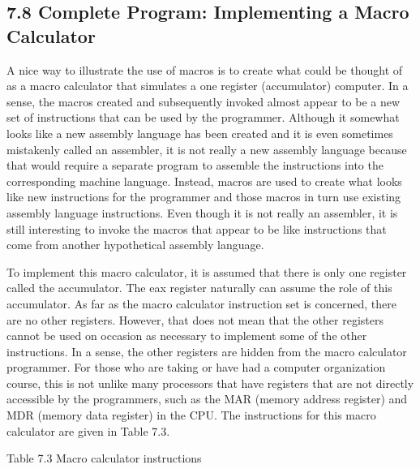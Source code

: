\documentclass[10pt]{book}
\begin{document}
\begin{center}
\begin{center}
\subsection*{7.8 Complete Program: Implementing a Macro Calculator}
A nice way to illustrate the use of macros is to create what could be thought of as a macro calculator that simulates a one register (accumulator) computer. In a sense, the macros created and subsequently invoked almost appear to be a new set of instructions that can be used by the programmer. Although it somewhat looks like a new assembly language has been created and it is even sometimes mistakenly called an assembler, it is not really a new assembly language because that would require a separate program to assemble the instructions into the corresponding machine language. Instead, macros are used to create what looks like new instructions for the programmer and those macros in turn use existing assembly language instructions. Even though it is not really an assembler, it is still interesting to invoke the macros that appear to be like instructions that come from another hypothetical assembly language.

To implement this macro calculator, it is assumed that there is only one register called the accumulator. The eax register naturally can assume the role of this accumulator. As far as the macro calculator instruction set is concerned, there are no other registers. However, that does not mean that the other registers cannot be used on occasion as necessary to implement some of the other instructions. In a sense, the other registers are hidden from the macro calculator programmer. For those who are taking or have had a computer organization course, this is not unlike many processors that have registers that are not directly accessible by the programmers, such as the MAR (memory address register) and MDR (memory data register) in the CPU. The instructions for this macro calculator are given in Table 7.3.

Table 7.3 Macro calculator instructions



\end{center}
\end{center}
\end{document}
